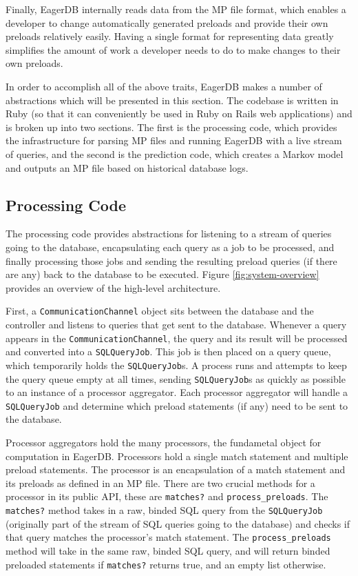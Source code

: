 \documentclass[12pt]{article}
\begin{document}
Finally, EagerDB internally reads data from the MP file format, which enables a developer to change automatically generated preloads and provide their own preloads relatively easily. Having a single format for representing data greatly simplifies the amount of work a developer needs to do to make changes to their own preloads.

In order to accomplish all of the above traits, EagerDB makes a number of abstractions which will be presented in this section. The codebase is written in Ruby (so that it can conveniently be used in Ruby on Rails web applications) and is broken up into two sections. The first is the processing code, which provides the infrastructure for parsing MP files and running EagerDB with a live stream of queries, and the second is the prediction code, which creates a Markov model and outputs an MP file based on historical database logs.

\subsection{Processing Code}

The processing code provides abstractions for listening to a stream of queries going to the database, encapsulating each query as a job to be processed, and finally processing those jobs and sending the resulting preload queries (if there are any) back to the database to be executed. Figure \ref{fig:system-overview} provides an overview of the high-level architecture.

First, a \texttt{CommunicationChannel} object sits between the database and the controller and listens to queries that get sent to the database. Whenever a query appears in the \texttt{CommunicationChannel}, the query and its result will be processed and converted into a \texttt{SQLQueryJob}. This job is then placed on a query queue, which temporarily holds the \texttt{SQLQueryJob}s. A process runs and attempts to keep the query queue empty at all times, sending \texttt{SQLQueryJob}s as quickly as possible to an instance of a processor aggregator. Each processor aggregator will handle a \texttt{SQLQueryJob} and determine which preload statements (if any) need to be sent to the database.

Processor aggregators hold the many processors, the fundametal object for computation in EagerDB. Processors hold a single match statement and multiple preload statements. The processor is an encapsulation of a match statement and its preloads as defined in an MP file. There are two crucial methods for a processor in its public API, these are \texttt{matches?} and \texttt{process\_preloads}. The \texttt{matches?} method takes in a raw, binded SQL query from the \texttt{SQLQueryJob} (originally part of the stream of SQL queries going to the database) and checks if that query matches the processor's match statement. The \texttt{process\_preloads} method will take in the same raw, binded SQL query, and will return binded preloaded statements if \texttt{matches?} returns true, and an empty list otherwise.
\end{document}
